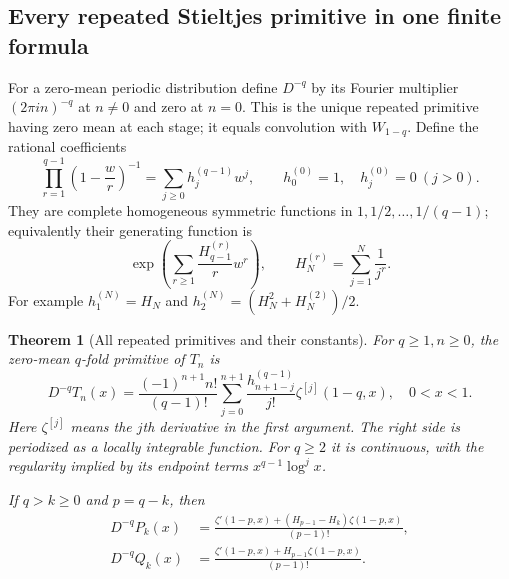 \documentclass[11pt,letterpaper]{article}
\numberwithin{equation}{section}
\theoremstyle{plain}
\newtheorem{theorem}{Theorem}[section]
\theoremstyle{definition}
\theoremstyle{remark}
\begin{document}
\subsection{Every repeated Stieltjes primitive in one finite formula}

For a zero-mean periodic distribution define $D^{-q}$ by its Fourier
multiplier $(2\pi i n)^{-q}$ at $n\ne0$ and zero at $n=0$. This is
the unique repeated primitive having zero mean at each stage; it equals
convolution with $W_{1-q}$. Define the rational coefficients
\begin{equation}\label{per:eq:h}
 \prod_{r=1}^{q-1}\left(1-\frac wr\right)^{-1}
       =\sum_{j\ge0}h_j^{(q-1)}w^j,
 \qquad h_0^{(0)}=1,\quad h_j^{(0)}=0\ (j>0).
\end{equation}
They are complete homogeneous symmetric functions in
$1,1/2,\ldots,1/(q-1)$; equivalently their generating function is
\[
 \exp\left(\sum_{r\ge1}\frac{H_{q-1}^{(r)}}r w^r\right),
 \qquad H_N^{(r)}=\sum_{j=1}^N\frac1{j^r}.
\]
For example $h_1^{(N)}=H_N$ and
$h_2^{(N)}=(H_N^2+H_N^{(2)})/2$.

\begin{theorem}[All repeated primitives and their constants]
\label{per:thm:primitive}
For $q\ge1,n\ge0$, the zero-mean $q$-fold primitive of $T_n$ is
\begin{equation}\label{per:eq:primitive}
 D^{-q}T_n(x)=\frac{(-1)^{n+1}n!}{(q-1)!}
 \sum_{j=0}^{n+1}\frac{h_{n+1-j}^{(q-1)}}{j!}
                              \zeta^{[j]}(1-q,x),\quad 0<x<1.
\end{equation}
Here $\zeta^{[j]}$ means the $j$th derivative in the first argument.
The right side is periodized as a locally integrable function. For
$q\ge2$ it is continuous, with the regularity implied by its endpoint
terms $x^{q-1}\log^j x$.

If $q>k\ge0$ and $p=q-k$, then
\begin{align}
 D^{-q}P_k(x)&=
 \frac{\zeta'(1-p,x)+(H_{p-1}-H_k)\zeta(1-p,x)}{(p-1)!},
 \label{per:eq:Pprimitive}\\
 D^{-q}Q_k(x)&=
 \frac{\zeta'(1-p,x)+H_{p-1}\zeta(1-p,x)}{(p-1)!}.
 \label{per:eq:Qprimitive}
\end{align}
\end{theorem}
\end{document}
